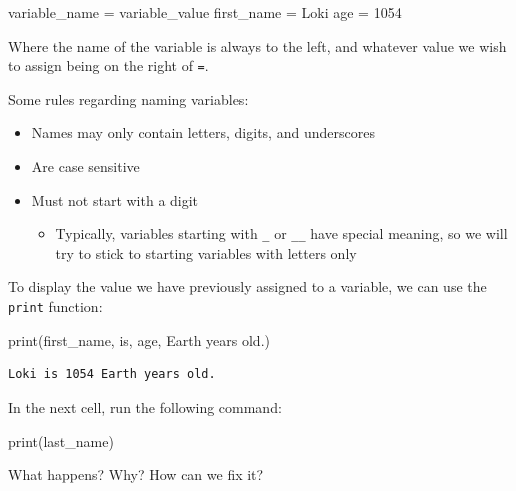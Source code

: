 \documentclass[
  letterpaper,
  DIV=11,
  numbers=noendperiod]{scrreprt}
\newenvironment{Shaded}{\begin{snugshade}}{\end{snugshade}}
\newcommand{\BuiltInTok}[1]{\textcolor[rgb]{0.00,0.23,0.31}{#1}}
\newcommand{\DecValTok}[1]{\textcolor[rgb]{0.68,0.00,0.00}{#1}}
\newcommand{\NormalTok}[1]{\textcolor[rgb]{0.00,0.23,0.31}{#1}}
\newcommand{\OperatorTok}[1]{\textcolor[rgb]{0.37,0.37,0.37}{#1}}
\newcommand{\StringTok}[1]{\textcolor[rgb]{0.13,0.47,0.30}{#1}}
\providecommand{\tightlist}{%
  \setlength{\itemsep}{0pt}\setlength{\parskip}{0pt}}\usepackage{longtable,booktabs,array}
\begin{document}
\begin{Shaded}
\begin{Highlighting}[]
\NormalTok{variable\_name }\OperatorTok{=} \StringTok{\textquotesingle{}variable\_value\textquotesingle{}}
\NormalTok{first\_name }\OperatorTok{=} \StringTok{\textquotesingle{}Loki\textquotesingle{}}
\NormalTok{age }\OperatorTok{=} \DecValTok{1054}
\end{Highlighting}
\end{Shaded}

Where the name of the variable is always to the left, and whatever value
we wish to assign being on the right of \texttt{=}.

Some rules regarding naming variables:

\begin{itemize}
\tightlist
\item
  Names may only contain letters, digits, and underscores
\item
  Are case sensitive
\item
  Must not start with a digit

  \begin{itemize}
  \tightlist
  \item
    Typically, variables starting with \texttt{\_} or \texttt{\_\_} have
    special meaning, so we will try to stick to starting variables with
    letters only
  \end{itemize}
\end{itemize}

To display the value we have previously assigned to a variable, we can
use the \texttt{print} function:

\begin{Shaded}
\begin{Highlighting}[]
\BuiltInTok{print}\NormalTok{(first\_name, }\StringTok{\textquotesingle{}is\textquotesingle{}}\NormalTok{, age, }\StringTok{\textquotesingle{}Earth years old.\textquotesingle{}}\NormalTok{)}
\end{Highlighting}
\end{Shaded}

\begin{verbatim}
Loki is 1054 Earth years old.
\end{verbatim}

\begin{tcolorbox}[enhanced jigsaw, rightrule=.15mm, opacitybacktitle=0.6, colback=white, toprule=.15mm, colframe=quarto-callout-warning-color-frame, bottomtitle=1mm, bottomrule=.15mm, arc=.35mm, coltitle=black, breakable, title={Challenge 1}, titlerule=0mm, opacityback=0, colbacktitle=quarto-callout-warning-color!10!white, left=2mm, toptitle=1mm, leftrule=.75mm]
In the next cell, run the following command:

\begin{Shaded}
\begin{Highlighting}[]
\BuiltInTok{print}\NormalTok{(last\_name)}
\end{Highlighting}
\end{Shaded}

What happens? Why? How can we fix it?
\end{tcolorbox}
\end{document}
